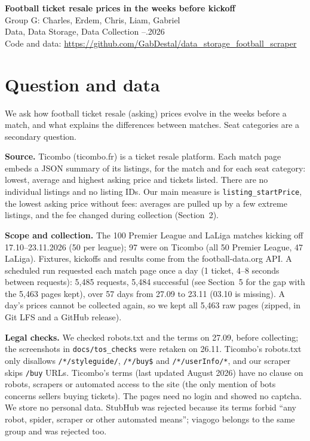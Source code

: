 \documentclass[11pt,a4paper]{article}
\begin{document}
\begin{center}
{\Large\bfseries Football ticket resale prices in the weeks before kickoff}\\[6pt]
Group G: Charles, Erdem, Chris, Liam, Gabriel\\
Data, Data Storage, Data Collection \quad--.2026\\
Code and data: \url{https://github.com/GabDestal/data_storage_football_scraper}
\end{center}

\section{Question and data}

We ask how football ticket resale (asking) prices evolve in the weeks before a match, and what explains the differences between matches. Seat categories are a secondary question.

\textbf{Source.} Ticombo (ticombo.fr) is a ticket resale platform. Each match page embeds a JSON summary of its listings, for the match and for each seat category: lowest, average and highest asking price and tickets listed. There are no individual listings and no listing IDs. Our main measure is \texttt{listing\_startPrice}, the lowest asking price without fees: averages are pulled up by a few extreme listings, and the fee changed during collection (Section~2).

\textbf{Scope and collection.} The 100 Premier League and LaLiga matches kicking off 17.10--23.11.2026 (50 per league); 97 were on Ticombo (all 50 Premier League, 47 LaLiga). Fixtures, kickoffs and results come from the football-data.org API. A scheduled run requested each match page once a day (1 ticket, 4--8 seconds between requests): 5,485 requests, 5,484 successful (see Section~5 for the gap with the 5,463 pages kept), over 57 days from 27.09 to 23.11 (03.10 is missing). A day's prices cannot be collected again, so we kept all 5,463 raw pages (zipped, in Git LFS and a GitHub release).

\textbf{Legal checks.} We checked robots.txt and the terms on 27.09, before collecting; the screenshots in \texttt{docs/tos\_checks} were retaken on 26.11. Ticombo's robots.txt only disallows \texttt{/*/styleguide/}, \texttt{/*/buy\$} and \texttt{/*/userInfo/*}, and our scraper skips \texttt{/buy} URLs. Ticombo's terms (last updated August 2026) have no clause on robots, scrapers or automated access to the site (the only mention of bots concerns sellers buying tickets). The pages need no login and showed no captcha. We store no personal data. StubHub was rejected because its terms forbid ``any robot, spider, scraper or other automated means''; viagogo belongs to the same group and was rejected too.
\end{document}
